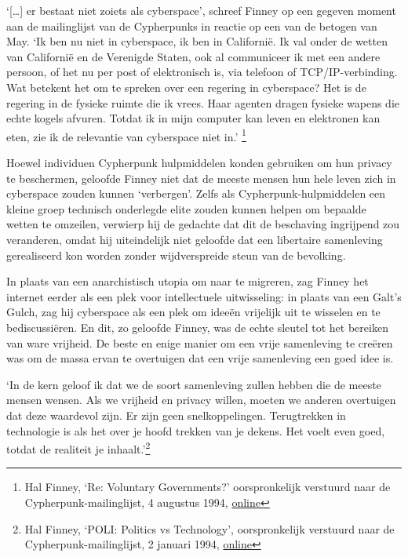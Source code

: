 \documentclass[
  a5paper,
  smalldemyvopaper,11pt,twoside,onecolumn,openright,extrafontsizes]{memoir}
\begin{document}
`{[}\ldots{]} er bestaat niet zoiets als cyberspace', schreef Finney op
een gegeven moment aan de mailinglijst van de Cypherpunks in reactie op
een van de betogen van May. `Ik ben nu niet in cyberspace, ik ben in
Californië. Ik val onder de wetten van Californië en de Verenigde
Staten, ook al communiceer ik met een andere persoon, of het nu per post
of elektronisch is, via telefoon of TCP/IP-verbinding. Wat betekent het
om te spreken over een regering in cyberspace? Het is de regering in de
fysieke ruimte die ik vrees. Haar agenten dragen fysieke wapens die
echte kogels afvuren. Totdat ik in mijn computer kan leven en elektronen
kan eten, zie ik de relevantie van cyberspace niet in.' \footnote{Hal
  Finney, `Re: Voluntary Governments?' oorspronkelijk verstuurd naar de
  Cypherpunk-mailinglijst, 4 augustus 1994,
  \href{https://cypherpunks.venona.com/date/1994/08/msg00239.html}{online}}

Hoewel individuen Cypherpunk hulpmiddelen konden gebruiken om hun
privacy te beschermen, geloofde Finney niet dat de meeste mensen hun
hele leven zich in cyberspace zouden kunnen `verbergen'. Zelfs als
Cypherpunk-hulpmiddelen een kleine groep technisch onderlegde elite
zouden kunnen helpen om bepaalde wetten te omzeilen, verwierp hij de
gedachte dat dit de beschaving ingrijpend zou veranderen, omdat hij
uiteindelijk niet geloofde dat een libertaire samenleving gerealiseerd
kon worden zonder wijdverspreide steun van de bevolking.

In plaats van een anarchistisch utopia om naar te migreren, zag Finney
het internet eerder als een plek voor intellectuele uitwisseling: in
plaats van een Galt's Gulch, zag hij cyberspace als een plek om ideeën
vrijelijk uit te wisselen en te bediscussiëren. En dit, zo geloofde
Finney, was de echte sleutel tot het bereiken van ware vrijheid. De
beste en enige manier om een vrije samenleving te creëren was om de
massa ervan te overtuigen dat een vrije samenleving een goed idee is.

`In de kern geloof ik dat we de soort samenleving zullen hebben die de
meeste mensen wensen. Als we vrijheid en privacy willen, moeten we
anderen overtuigen dat deze waardevol zijn. Er zijn geen
snelkoppelingen. Terugtrekken in technologie is als het over je hoofd
trekken van je dekens. Het voelt even goed, totdat de realiteit je
inhaalt.'\footnote{Hal Finney, `POLI: Politics vs Technology',
  oorspronkelijk verstuurd naar de Cypherpunk-mailinglijst, 2 januari
  1994,
  \href{https://cypherpunks.venona.com/date/1994/01/msg00014.html}{online}}
\end{document}
